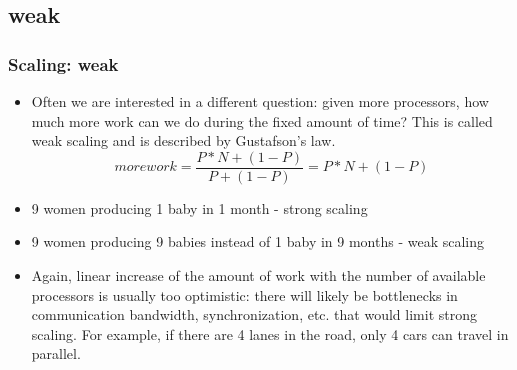 \subsection{weak}
\begin{frame}[fragile]
  \frametitle{Scaling: weak}
\begin{itemize}
\item Often we are interested in a different question: given more processors, how much more work 
  can we do during the fixed amount of time? 
This is called {\color{mycolordef}weak scaling} and is described by {\color{mycolordef}Gustafson's law}.
\begin{equation*}
morework = \frac{P*N + (1 - P)}{P + (1 - P)} = P*N + (1 - P)
\end{equation*}
\item 9 women producing 1 baby in 1 month - strong scaling
\item 9 women producing 9 babies instead of 1 baby in 9 months - weak scaling
\item Again, linear increase of the amount of work with the number of available processors is usually too optimistic: 
  there will likely be bottlenecks in communication bandwidth, synchronization, etc. that would limit strong scaling.
  For example, if there are 4 lanes in the road, only 4 cars can travel in parallel.
\end{itemize}
\end{frame}
